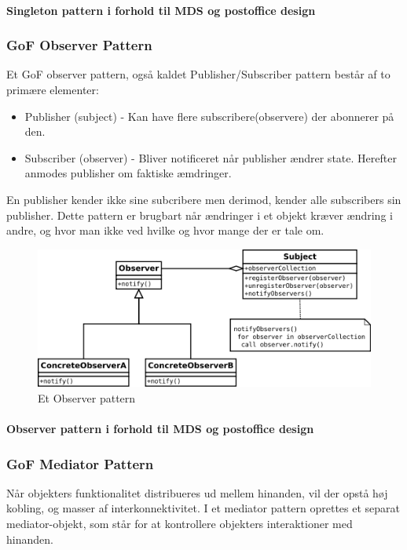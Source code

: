 \paragraph{Singleton pattern i forhold til MDS og postoffice design}

\subsubsection{GoF Observer Pattern}

Et GoF observer pattern, også kaldet Publisher/Subscriber pattern består af to primære elementer:

\begin{itemize}
	\item Publisher (subject) - Kan have flere subscribere(observere) der abonnerer på den.
	\item Subscriber (observer) - Bliver notificeret når publisher ændrer state. Herefter anmodes publisher om faktiske æmdringer.
\end{itemize}
En publisher kender ikke sine subcribere men derimod, kender alle subscribers sin publisher. Dette pattern er brugbart når ændringer i et objekt kræver ændring i andre, og hvor man ikke ved hvilke og hvor mange der er tale om.

\begin{figure}[h]
	\centering
	\includegraphics[width=0.8\linewidth]{figs/spm5/observerUML}
	\caption{Et Observer pattern}
	\label{fig:ObserverPattern}
\end{figure}

\paragraph{Observer pattern i forhold til MDS og postoffice design}

\subsubsection{GoF Mediator Pattern}
Når objekters funktionalitet distribueres ud mellem hinanden, vil der opstå høj kobling, og masser af interkonnektivitet.  I et mediator pattern oprettes et separat mediator-objekt, som står for at kontrollere objekters interaktioner med hinanden. 

